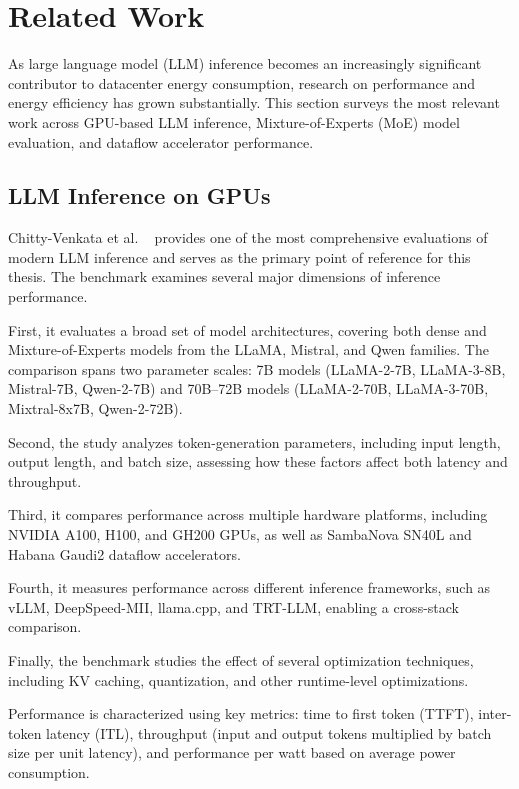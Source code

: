 \chapter{Related Work}
\label{chap:related}

As large language model (LLM) inference becomes an increasingly significant contributor to datacenter energy consumption, research on performance and energy efficiency has grown substantially. This section surveys the most relevant work across GPU-based LLM inference, Mixture-of-Experts (MoE) model evaluation, and dataflow accelerator performance.

\section{LLM Inference on GPUs}

Chitty-Venkata et al. ~\cite{LLMInfbench} provides one of the most comprehensive evaluations of modern LLM inference and serves as the primary point of reference for this thesis. The benchmark examines several major dimensions of inference performance.

First, it evaluates a broad set of model architectures, covering both dense and Mixture-of-Experts models from the LLaMA, Mistral, and Qwen families. The comparison spans two parameter scales: 7B models (LLaMA-2-7B, LLaMA-3-8B, Mistral-7B, Qwen-2-7B) and 70B–72B models (LLaMA-2-70B, LLaMA-3-70B, Mixtral-8x7B, Qwen-2-72B).

Second, the study analyzes token-generation parameters, including input length, output length, and batch size, assessing how these factors affect both latency and throughput.

Third, it compares performance across multiple hardware platforms, including NVIDIA A100, H100, and GH200 GPUs, as well as SambaNova SN40L and Habana Gaudi2 dataflow accelerators.

Fourth, it measures performance across different inference frameworks, such as vLLM, DeepSpeed-MII, llama.cpp, and TRT-LLM, enabling a cross-stack comparison.

Finally, the benchmark studies the effect of several optimization techniques, including KV caching, quantization, and other runtime-level optimizations.

Performance is characterized using key metrics: time to first token (TTFT), inter-token latency (ITL), throughput (input and output tokens multiplied by batch size per unit latency), and performance per watt based on average power consumption.

